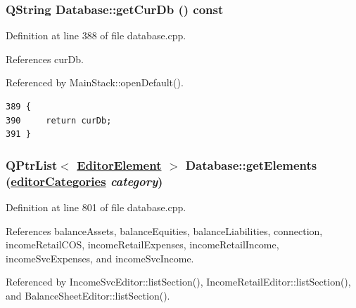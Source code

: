 \hypertarget{classDatabase_a10}{
\subsubsection[getCurDb]{\setlength{\rightskip}{0pt plus 5cm}QString Database::get\-Cur\-Db () const}}
\label{classDatabase_a10}


Definition at line 388 of file database.cpp.

References cur\-Db.

Referenced by Main\-Stack::open\-Default().

\footnotesize\begin{verbatim}389 {
390     return curDb;
391 }
\end{verbatim}\normalsize 


\hypertarget{classDatabase_a18}{
\subsubsection[getElements]{\setlength{\rightskip}{0pt plus 5cm}QPtr\-List$<$ \hyperlink{classEditorElement}{Editor\-Element} $>$ Database::get\-Elements (\hyperlink{classDatabase_w8}{editor\-Categories} {\em category})}}
\label{classDatabase_a18}


Definition at line 801 of file database.cpp.

References balance\-Assets, balance\-Equities, balance\-Liabilities, connection, income\-Retail\-COS, income\-Retail\-Expenses, income\-Retail\-Income, income\-Svc\-Expenses, and income\-Svc\-Income.

Referenced by Income\-Svc\-Editor::list\-Section(), Income\-Retail\-Editor::list\-Section(), and Balance\-Sheet\-Editor::list\-Section().

